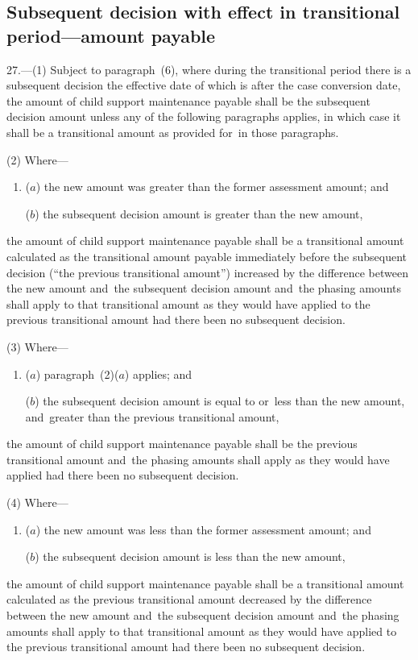 \documentclass[12pt,a4paper]{article}
\begin{document}
\subsection[27. Subsequent decision with effect in transitional period---amount payable]{\sloppy{} Subsequent decision with effect in transitional period---amount payable}

27.---(1)  Subject to paragraph~(6), where during the transitional period there is a subsequent decision the effective date of which is after the case conversion date, the amount of child support maintenance payable shall be the subsequent decision amount unless any of the following paragraphs applies, in which case it shall be a transitional amount as provided for~in those paragraphs.

(2) Where—
\begin{enumerate}\item[]
($a$) the new amount was greater than the former assessment amount; and

($b$) the subsequent decision amount is greater than the new amount,
\end{enumerate}
the amount of child support maintenance payable shall be a transitional amount calculated as the transitional amount payable immediately before the subsequent decision (“the previous transitional amount”) increased by the difference between the new amount and~the subsequent decision amount and~the phasing amounts shall apply to that transitional amount as they would have applied to the previous transitional amount had there been no subsequent decision.

(3) Where—
\begin{enumerate}\item[]
($a$) paragraph~(2)($a$)  applies; and

($b$) the subsequent decision amount is equal to or~less than the new amount,
and~greater than the previous transitional amount,  %
\end{enumerate}
the amount of child support maintenance payable shall be the previous transitional amount and~the phasing amounts shall apply as they would have applied had there been no subsequent decision.

(4) Where—
\begin{enumerate}\item[]
($a$) the new amount was less than the former assessment amount; and

($b$) the subsequent decision amount is less than the new amount,
\end{enumerate}
the amount of child support maintenance payable shall be a transitional amount calculated as the previous transitional amount decreased by the difference between the new amount and~the subsequent decision amount and~the phasing amounts shall apply to that transitional amount as they would have applied to the previous transitional amount had there been no subsequent decision.
\end{document}
